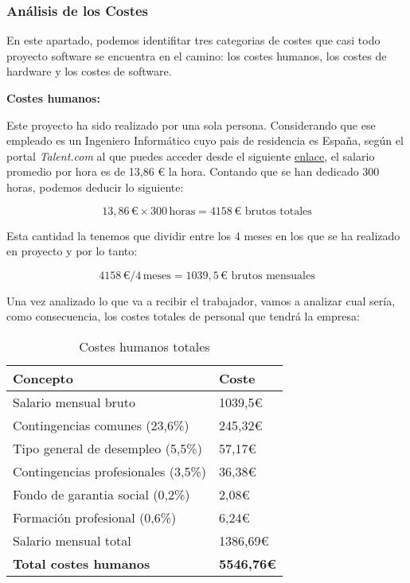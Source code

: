 \subsubsection{Análisis de los Costes}

En este apartado, podemos identifitar tres categorias de costes que casi todo proyecto software se encuentra en el camino:  los costes humanos, los costes de hardware y los costes de software.

\textbf{Costes humanos:}

Este proyecto ha sido realizado por una sola persona. Considerando que ese empleado es un Ingeniero Informático cuyo pais de residencia es España, según el portal \textit{Talent.com} al que puedes acceder desde el siguiente \href{https://es.talent.com/salary?job=ingeniero+inform%C3%A1tico}{enlace}, el salario promedio por hora es de 13,86 € la hora. Contando que se han dedicado 300 horas, podemos deducir lo siguiente:

\[ 13,86 \, \text{€} \times 300 \, \text{horas} = 4158 \, \text{€ brutos totales} \]

Esta cantidad la tenemos que dividir entre los 4 meses en los que se ha realizado en proyecto y por lo tanto:

\[ 4158 \, \text{€} / 4 \, \text{meses} = 1039,5 \, \text{€ brutos mensuales} \]

Una vez analizado lo que va a recibir el trabajador, vamos a analizar cual sería, como consecuencia, los costes totales de personal que tendrá la empresa:


\begin{table}[H]
    \centering
    \renewcommand{\arraystretch}{1.2}
    \setlength{\tabcolsep}{20pt}
    \begin{tabular}{l l}
        \hline
        \textbf{Concepto} & \textbf{Coste} \\ \hline
        Salario mensual bruto & 1039,5€ \\
        Contingencias comunes (23,6\%) & 245,32€\\
        Tipo general de  desempleo (5,5\%) & 57,17€\\
        Contingencias profesionales (3,5\%) & 36,38€\\
        Fondo de garantia social (0,2\%)& 2,08€\\
        Formación profesional (0,6\%) & 6,24€\\
        Salario mensual total & 1386,69€\\  \hline
        \textbf{Total costes humanos} & \textbf{5546,76€}\\ \hline
    \end{tabular}
    \caption{Costes humanos totales}
    \label{tab:costes_humanos}
\end{table}

